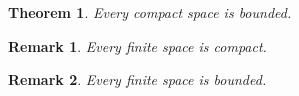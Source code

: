 \documentclass{article}
\newtheorem{theorem}{Theorem}
\newtheorem{rem*}{Remark}
\begin{document}
\begin{theorem} Every compact space is bounded. \end{theorem}
\begin{rem*} Every finite space is compact. \end{rem*}
\begin{rem*} Every finite space is bounded. \end{rem*}
\end{document}
